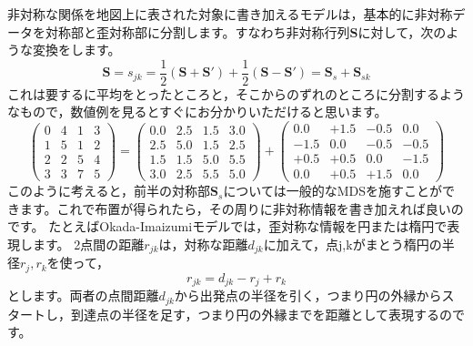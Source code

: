 \documentclass{ltjsbook}
\begin{document}
非対称な関係を地図上に表された対象に書き加えるモデルは，基本的に非対称データを対称部と歪対称部に分割します。すなわち非対称行列$\bm{S}$に対して，次のような変換をします。
\[ \bm{S} = s_{jk} = \frac{1}{2}(\bm{S}+\bm{S}') + \frac{1}{2}(\bm{S}-\bm{S}')= \bm{S}_s + \bm{S}_{sk} \]
これは要するに平均をとったところと，そこからのずれのところに分割するようなもので，数値例を見るとすぐにお分かりいただけると思います。
\[ \begin{pmatrix} 0 & 4 & 1 & 3 \\
                1 & 5 & 1 & 2 \\
                2 & 2 & 5 & 4 \\
                3 & 3 & 7 & 5\end{pmatrix} =
    \begin{pmatrix} 0.0 & 2.5 & 1.5 & 3.0 \\ 2.5 & 5.0 & 1.5 & 2.5 \\ 1.5 & 1.5 & 5.0 & 5.5\\3.0 & 2.5 & 5.5 & 5.0 \end{pmatrix}
    +
    \begin{pmatrix} 0.0 & +1.5 & -0.5 & 0.0 \\ -1.5 & 0.0 & -0.5 & -0.5 \\ +0.5 & +0.5 & 0.0 & -1.5 \\ 0.0 & +0.5 & +1.5 & 0.0 \end{pmatrix}
\]
このように考えると，前半の対称部$\bm{S}_s$については一般的なMDSを施すことができます。これで布置が得られたら，その周りに非対称情報を書き加えれば良いのです。
たとえばOkada-Imaizumiモデル\citep{okada1987nonmetric,okada1997asymmetric}では，歪対称な情報を円または楕円で表現します。
2点間の距離$r_{jk}$は，対称な距離$d_{jk}$に加えて，点j,kがまとう楕円の半径$r_j,r_k$を使って，
\[ r_{jk} = d_{jk} -r_j + r_k \]
とします。両者の点間距離$d_{jk}$から出発点の半径を引く，つまり円の外縁からスタートし，到達点の半径を足す，つまり円の外縁までを距離として表現するのです。
\end{document}
